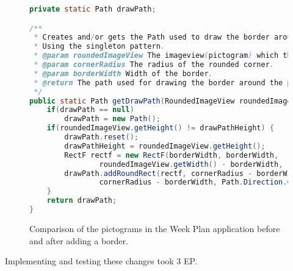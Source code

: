  \begin{figure} 
    \begin{lstlisting}[language=java, caption={One of the singletons used to solve this task. }, label=lst:singleton_example] 
private static Path drawPath;

/**
 * Creates and/or gets the Path used to draw the border around the pictograms with rounded corners.
 * Using the singleton pattern.
 * @param roundedImageView The imageview(pictogram) which the path will be used on.
 * @param cornerRadius The radius of the rounded corner.
 * @param borderWidth Width of the border.
 * @return The path used for drawing the border around the pictograms.
 */
public static Path getDrawPath(RoundedImageView roundedImageView, float cornerRadius, float borderWidth){
    if(drawPath == null)
        drawPath = new Path();
    if(roundedImageView.getHeight() != drawPathHeight) {
        drawPath.reset();
        drawPathHeight = roundedImageView.getHeight();
        RectF rectf = new RectF(borderWidth, borderWidth,
                roundedImageView.getWidth() - borderWidth, roundedImageView.getHeight() - borderWidth);
        drawPath.addRoundRect(rectf, cornerRadius - borderWidth,
                cornerRadius - borderWidth, Path.Direction.CW);
    }
    return drawPath;
}

    \end{lstlisting} 
\end{figure} 

\begin{figure}[h]
    \centering
    \caption{Comparison of the pictograms in the Week Plan application before and after adding a border.}
    \label{fig:before-after-borders}
\end{figure}

Implementing and testing these changes took 3 EP. 

